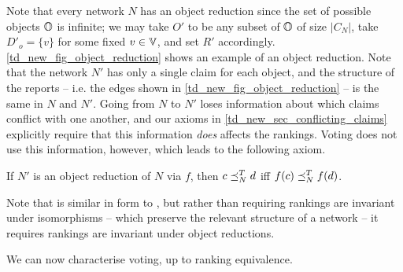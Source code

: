 Note that every network $N$ has an object reduction since the set of
possible objects $\mathbb{O}$ is infinite; we may take $O'$ to be any subset of $\mathbb{O}$ of
size $|C_N|$, take $D'_o = \{v\}$ for some fixed $v \in \mathbb{V}$, and set $R'$
accordingly.
%
\cref{td_new_fig_object_reduction} shows an example of an object reduction.
Note that the network $N'$ has only a single claim for each object, and the
structure of the reports -- i.e. the edges shown in
\cref{td_new_fig_object_reduction} -- is the same in $N$ and $N'$. Going from
$N$ to $N'$ loses information about which claims conflict with one another, and
our axioms in \cref{td_new_sec_conflicting_claims} explicitly require that this
information \emph{does} affects the rankings. Voting does not use this
information, however, which leads to the following axiom.

\begin{axiom}[\objectirrelevance]
    If $N'$ is an object reduction of $N$ via $f$, then $c \preceq_N^T d$ iff
    $f(c) \preceq_N^T f(d)$.
\end{axiom}

Note that \objectirrelevance{} is similar in form to \symmetry{}, but rather
than requiring rankings are invariant under isomorphisms -- which
preserve the relevant structure of a network -- it requires rankings are
invariant under object reductions.

We can now characterise voting, up to ranking equivalence.

